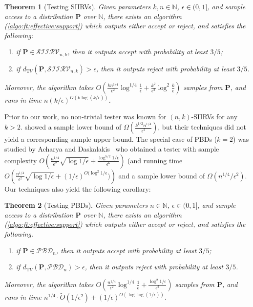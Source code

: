 \documentclass[11pt]{article}
\newcommand{\new}[1]{{\color{red} #1}}
\newcommand{\new}[1]{{#1}}
\newtheorem{theorem}{Theorem}[section]
\theoremstyle{definition}
\newcommand{\p}{\mathbf{P}}
\newcommand{\dtv}{d_{\mathrm TV}}
\newcommand{\eps}{\epsilon}
\newcommand{\accept}{\textsf{accept}\xspace}
\newcommand{\reject}{\textsf{reject}\xspace}
\newcommand{\bigO}[1]{{O\left( #1 \right)}}
\newcommand{\bigOmega}[1]{{\Omega\left( #1 \right)}}
\newcommand{\tildeO}[1]{\tilde{O}\left( #1 \right)}
\newcommand{\classksiirv}[2][n]{\ensuremath{\mathcal{SIIRV}_{#1,#2}}\xspace}
\begin{document}
\begin{theorem}[Testing SIIRVs]\label{theo:testing:ksiirv}
    Given parameters $k,n\in\mathbb{N}$, $\eps\in(0,1]$, and sample access to a distribution $\p$ over $\mathbb{N}$, there exists an algorithm (\cref{algo:ft:effective:support}) which outputs either \accept or \reject, and satisfies the following:
    \begin{enumerate}
        \item if $\p \in \classksiirv[n]{k}$, then it outputs \accept with probability at least $3/5$;
        \item if $\dtv(\p,\classksiirv[n]{k})>\eps$, then it outputs \reject with probability at least $3/5$.
    \end{enumerate}
    Moreover, the algorithm takes $\bigO{\frac{k n^{1/4}}{\eps^2}\log^{1/4}\frac{1}{\eps} + \frac{k^2}{\eps^2} \log^2\frac{k}{\eps}}$ samples from $\p$, and runs in time $n(k/\eps)^{\bigO{k\log(k/\eps)}}$.
\end{theorem}

Prior to our work, no non-trivial tester was known for $(n, k)$-SIIRVs for any $k>2$. 
\cite{CDGR:16} showed a sample lower bound of $\bigOmega{\frac{k^{1/2}n^{1/4}}{\eps^2}}$, but their techniques
did not yield a corresponding sample upper bound. The special case of PBDs ($k=2$) was studied by 
Acharya and Daskalakis~\cite{AD15} who obtained a tester with sample complexity 
$\bigO{\frac{n^{1/4}}{\eps^2}\sqrt{\log1/\eps}+\frac{\log^{5/2}1/\eps}{\eps^6}}$ \new{(and running time $\bigO{\frac{n^{1/4}}{\eps^2}\sqrt{\log1/\eps}+(1/\eps)^{O(\log^2 1/\eps})}$} and a sample lower bound of $\Omega(n^{1/4}/\eps^2)$. 
Our techniques also yield the following corollary: 

\begin{theorem}[Testing PBDs]\label{theo:testing:[bd}
    Given parameters $n\in\mathbb{N}$, $\eps\in(0,1]$, and sample access to a distribution $\p$ over $\mathbb{N}$, there exists an algorithm (\cref{algo:ft:effective:support}) which outputs either \accept or \reject, and satisfies the following.
    \begin{enumerate}
        \item if $\p \in \mathcal{PBD}_{n}$, then it outputs \accept with probability at least $3/5$;
        \item if $\dtv(\p,\mathcal{PBD}_{n}) > \eps$, then it outputs \reject with probability at least $3/5$.
    \end{enumerate}
    Moreover, the algorithm takes $\bigO{\frac{n^{1/4}}{\eps^2}\log^{1/4}\frac{1}{\eps} + \frac{\log^2 1/\eps}{\eps^2}}$ samples from $\p$, and runs in time $n^{1/4}\cdot\tildeO{{1}/{\eps^2}}+(1/\eps)^{\bigO{\log\log(1/\eps)}}$.
\end{theorem}
\end{document}
